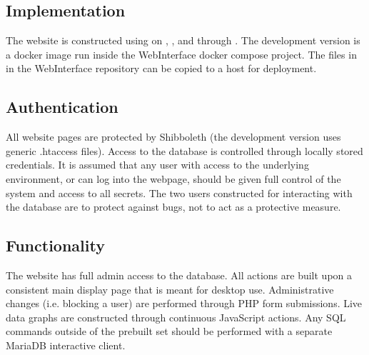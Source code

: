 \subsection{Implementation}
The website is constructed using  on , , and  through .
The development version is a docker image run inside the WebInterface docker compose project.
The files in  in the WebInterface repository can be copied to a host for deployment.

\subsection{Authentication}
All website pages are protected by Shibboleth (the development version uses generic .htaccess files).
Access to the database is controlled through locally stored credentials.
It is assumed that any user with access to the underlying environment,
    or can log into the webpage,
    should be given full control of the system and access to all secrets.
The two users constructed for interacting with the database are to protect against bugs,
    not to act as a protective measure.

\subsection{Functionality}
The website has full admin access to the database.
All actions are built upon a consistent main display page that is meant for desktop use.
Administrative changes (i.e. blocking a user) are performed through PHP form submissions.
Live data graphs are constructed through continuous JavaScript actions.
Any SQL commands outside of the prebuilt set should be performed with a separate MariaDB interactive client.